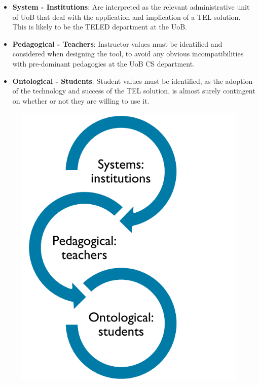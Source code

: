 \begin{itemize}

\item \textbf{System - Institutions}: Are interpreted as the relevant administrative unit of UoB that deal with the application and implication of a TEL solution. This is likely to be the TELED department at the UoB.

\item \textbf{Pedagogical - Teachers}: Instructor values must be identified and considered when designing the tool, to avoid any obvious incompatibilities with pre-dominant pedagogies at the UoB CS department.

\item \textbf{Ontological - Students}: Student values must be identified, as the adoption of the technology and success of the TEL solution, is almost surely contingent on whether or not they are willing to use it.

\end{itemize}

\begin{figure}[H]
	\centering
	\includegraphics[scale=0.5]{figures/flex}
	\label{fig:The Three Levels of Flexibility}
\end{figure}

